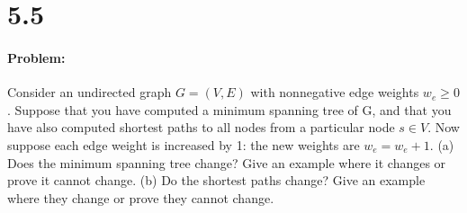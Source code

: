 \documentclass[12pt]{article}
\begin{document}
\section*{5.5}
\paragraph{Problem:}

Consider an undirected graph $G = (V, E)$ with nonnegative edge weights $ w_e \ge 0$. Suppose that
you have computed a minimum spanning tree of G, and that you have also computed shortest
paths to all nodes from a particular node $s \in V$.
Now suppose each edge weight is increased by 1: the new weights are $w_e = w_e + 1$.
(a) Does the minimum spanning tree change? Give an example where it changes or prove it
cannot change.
(b) Do the shortest paths change? Give an example where they change or prove they cannot
change.
\end{document}
